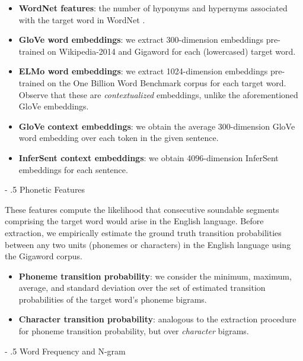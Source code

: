 \documentclass[11pt,a4paper]{article}
\makeatletter
\renewcommand\paragraph{%
    \@startsection{paragraph}{4}{0mm}%
        {-\baselineskip}%
        {.5\baselineskip}%
        {\normalfont\normalsize\bfseries}}
\makeatother
\begin{document}
\begin{itemize}
  \item \textbf{WordNet features}: the number of hyponyms and hypernyms associated with the target word in WordNet \citep{Fellbaum:2005}.
  \item \textbf{GloVe word embeddings}: we extract 300-dimension embeddings pre-trained on Wikipedia-2014 and Gigaword \citep{pennington2014glove} for each (lowercased) target word. 
  \item \textbf{ELMo word embeddings}: we extract 1024-dimension embeddings pre-trained on the One Billion Word Benchmark corpus \citep{Peters:2018} for each target word. Observe that these are \textit{contextualized} embeddings, unlike the aforementioned GloVe embeddings. 
  \item \textbf{GloVe context embeddings}: we obtain the average 300-dimension GloVe word embedding over each token in the given sentence.
  \item \textbf{InferSent context embeddings}: we obtain 4096-dimension InferSent embeddings \citep{conneau-EtAl:2017:EMNLP2017} for each sentence.
\end{itemize}

\paragraph{Phonetic Features}

These features compute the likelihood that consecutive soundable segments comprising the target word would arise in the English language. Before extraction, we empirically estimate the ground truth transition probabilities between any two units (phonemes or characters) in the English language using the Gigaword corpus. 

\begin{itemize}
  \item \textbf{Phoneme transition probability}: we consider the minimum, maximum, average, and standard deviation over the set of estimated transition probabilities of the target word's phoneme bigrams.
  \item \textbf{Character transition probability}: analogous to the extraction procedure for phoneme transition probability, but over \textit{character} bigrams.
\end{itemize}

\paragraph{Word Frequency and N-gram}
\end{document}
